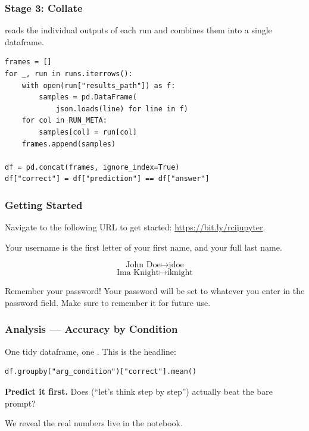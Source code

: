 \documentclass{beamer}
\begin{document}
\begin{frame}[fragile]
    \frametitle{Stage 3: Collate}
     reads the individual outputs of each run and combines them into a single dataframe.
    \begin{lstlisting}[style=demo]
frames = []
for _, run in runs.iterrows():
    with open(run["results_path"]) as f:
        samples = pd.DataFrame(
            json.loads(line) for line in f)
    for col in RUN_META:
        samples[col] = run[col]
    frames.append(samples)

df = pd.concat(frames, ignore_index=True)
df["correct"] = df["prediction"] == df["answer"]
    \end{lstlisting}
\end{frame}

\begin{frame}
    \frametitle{Getting Started}
    Navigate to the following URL to get started: \url{https://bit.ly/rcijupyter}.

    \bigskip

    Your username is the first letter of your first name, and your full last name.

    $$\text{John Doe} \mapsto \text{jdoe}$$
    $$\text{Ima Knight} \mapsto \text{iknight}$$

    \bigskip

    \begin{alertblock}{\centering Remember your password!}
        Your password will be set to whatever you enter in the password field.
        Make sure to remember it for future use.
    \end{alertblock}
\end{frame}

\begin{frame}[fragile]
    \frametitle{Analysis --- Accuracy by Condition}
    One tidy dataframe, one . This is the headline:
    \begin{lstlisting}[style=demo]
df.groupby("arg_condition")["correct"].mean()
    \end{lstlisting}

    \bigskip

    \textbf{Predict it first.} Does  (``let's think step by
    step'') actually beat the bare  prompt?

    \bigskip

    We reveal the real numbers live in the notebook.
\end{frame}
\end{document}
